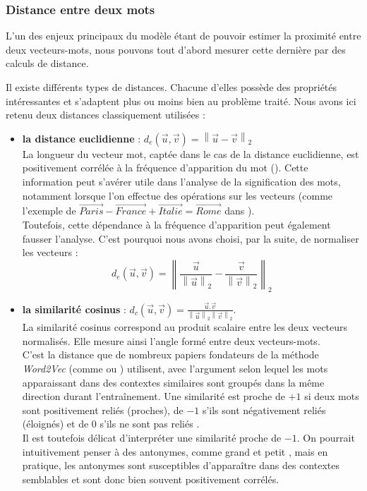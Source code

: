 \documentclass[11pt,french,french]{article}
\providecommand{\tightlist}{%
  \setlength{\parskip}{0pt}
  }
\begin{document}
\subsubsection{Distance entre deux mots}\label{distance-entre-deux-mots}

L'un des enjeux principaux du modèle étant de pouvoir estimer la
proximité entre deux vecteurs-mots, nous pouvons tout d'abord mesurer
cette dernière par des calculs de distance.

Il existe différents types de distances. Chacune d'elles possède des
propriétés intéressantes et s'adaptent plus ou moins bien au problème
traité. Nous avons ici retenu deux distances classiquement utilisées :

\begin{itemize}
\tightlist
\item
  \textbf{la distance euclidienne} :
  \(d_{e}(\vec{u},\vec{v}) = \left\| \vec{u} - \vec{v} \right\|_2\)\\
  La longueur du vecteur mot, captée dans le cas de la distance
  euclidienne, est positivement corrélée à la fréquence d'apparition du
  mot (\cite{Schakel}). Cette information peut s'avérer utile dans
  l'analyse de la signification des mots, notamment lorsque l'on
  effectue des opérations sur les vecteurs (comme l'exemple de
  \(\overrightarrow{Paris} - \overrightarrow{France} + \overrightarrow{Italie} = \overrightarrow{Rome}\)
  dans \cite{Mikolov}).\\
  Toutefois, cette dépendance à la fréquence d'apparition peut également
  fausser l'analyse. C'est pourquoi nous avons choisi, par la suite, de
  normaliser les vecteurs :
  \[ d_{e}(\vec{u},\vec{v}) = \left\| \frac{\vec{u}}{\left\| \vec{u} \right\|_2} - \frac{\vec{v}}{\left\| \vec{v} \right\|_2}  \right\|_2\]
\item
  \textbf{la similarité cosinus} :
  \(d_{c}(\vec{u}, \vec{v}) = \frac{\vec{u}.\vec{v}}{\left\| \vec{u} \right\|_2 \left\| \vec{v} \right\|_2 }\).\\
  La similarité cosinus correspond au produit scalaire entre les deux
  vecteurs normalisés. Elle mesure ainsi l'angle formé entre deux
  vecteurs-mots.\\
  C'est la distance que de nombreux papiers fondateurs de la méthode
  \emph{Word2Vec} (comme \cite{Mikolov} ou \cite{Levy}) utilisent, avec
  l'argument selon lequel les mots apparaissant dans des contextes
  similaires sont groupés dans la même direction durant l'entraînement.
  Une similarité est proche de \(+1\) si deux mots sont positivement
  reliés (proches), de \(-1\) s'ils sont négativement reliés (éloignés)
  et de 0 s'ils ne sont pas \og reliés \fg{}.\\
  Il est toutefois délicat d'interpréter une similarité proche de
  \(-1\). On pourrait intuitivement penser à des antonymes, comme
  \og grand \fg{} et \og petit \fg{}, mais en pratique, les antonymes
  sont susceptibles d'apparaître dans des contextes semblables et sont
  donc bien souvent positivement corrélés.
\end{itemize}
\end{document}
